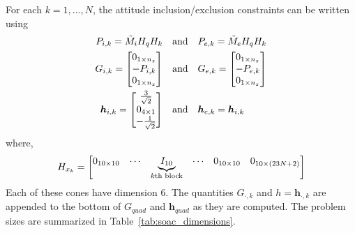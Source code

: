 \documentclass[10pt]{article}
\begin{document}
For each $k=1,\ldots,N$, the attitude inclusion/exclusion constraints can be written using 
\begin{align*}
P_{i,k} = \tilde{M}_i H_q H_k  \quad &\text{and} \quad P_{e,k} = \tilde{M}_e H_q H_k \\
G_{i,k} = \begin{bmatrix}
0_{1 \times n_z} \\ - P_{i,k} \\ 0_{1 \times n_z}
\end{bmatrix} \quad &\text{and} \quad G_{e,k} = \begin{bmatrix}
0_{1 \times n_z} \\ -P_{e,k} \\ 0_{1 \times n_z}
\end{bmatrix} \\
\bm{h}_{i,k} = \begin{bmatrix}
\frac{3}{\sqrt{2}} \\ 0_{4 \times 1} \\ -\frac{1}{\sqrt{2}}
\end{bmatrix} \quad &\text{and} \quad \bm{h}_{e,k} = \bm{h}_{i,k}
\end{align*}
where,
\begin{equation*}
H_{x_k} = \begin{bmatrix}
0_{10 \times 10} & \cdots & \underbrace{I_{10}}_{k\text{th block}} & \cdots & 0_{10 \times 10} & 0_{10 \times (23N+2)} \end{bmatrix}
\end{equation*}
Each of these cones have dimension 6. The quantities $G_{\cdot,k}$ and $h=\bm{h}_{\cdot,k}$ are appended to the bottom of $G_{quad}$ and $\bm{h}_{quad}$ as they are computed. The problem sizes are summarized in Table~\ref{tab:soac_dimensions}.
\end{document}
